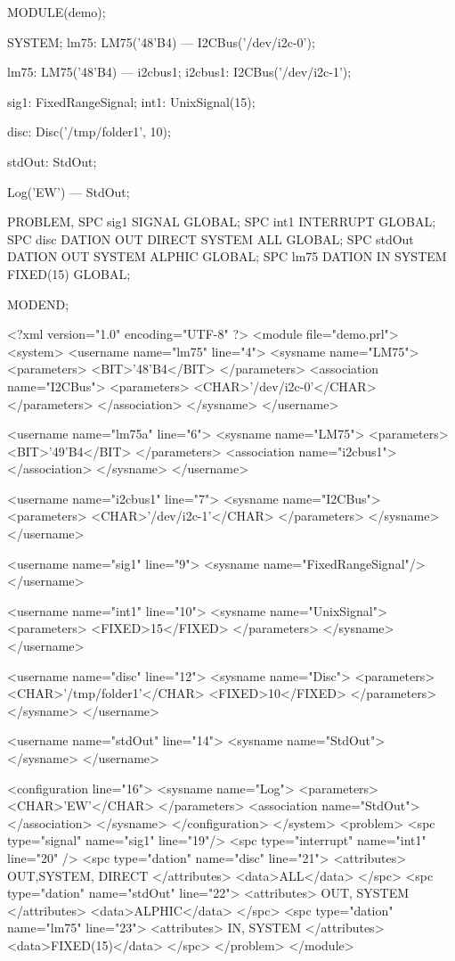 \begin{PEARLCode}
MODULE(demo);

SYSTEM;
lm75: LM75('48'B4) --- I2CBus('/dev/i2c-0');

lm75: LM75('48'B4) --- i2cbus1;
i2cbus1: I2CBus('/dev/i2c-1');

sig1: FixedRangeSignal;
int1: UnixSignal(15);

disc: Disc('/tmp/folder1', 10);

stdOut: StdOut;

Log('EW') --- StdOut;

PROBLEM,
SPC sig1 SIGNAL GLOBAL;
SPC int1 INTERRUPT GLOBAL;
SPC disc DATION OUT DIRECT SYSTEM ALL GLOBAL;
SPC stdOut DATION OUT SYSTEM ALPHIC GLOBAL;
SPC lm75 DATION IN SYSTEM FIXED(15) GLOBAL;

MODEND;
\end{PEARLCode}

\begin{XMLCode}
<?xml version="1.0" encoding="UTF-8" ?>
<module file="demo.prl">
<system>
   <username name="lm75" line="4">
      <sysname name="LM75">
      <parameters>
         <BIT>'48'B4</BIT>
      </parameters>
      <association name="I2CBus">
         <parameters>
            <CHAR>'/dev/i2c-0'</CHAR>
         </parameters>
      </association>
   </sysname>
</username>

<username name="lm75a" line="6">
   <sysname name="LM75">
      <parameters>
         <BIT>'49'B4</BIT>
      </parameters>
      <association name="i2cbus1">
      </association>
   </sysname>
</username>

<username name="i2cbus1" line="7">
   <sysname name="I2CBus">
      <parameters>
         <CHAR>'/dev/i2c-1'</CHAR>
      </parameters>
   </sysname>
</username>

<username name="sig1" line="9">
   <sysname name="FixedRangeSignal"/>
</username>

<username name="int1" line="10">
   <sysname name="UnixSignal">
      <parameters>
         <FIXED>15</FIXED>
      </parameters>
   </sysname>
</username>

<username name="disc" line="12">
   <sysname name="Disc">
      <parameters>
         <CHAR>'/tmp/folder1'</CHAR>
         <FIXED>10</FIXED>
      </parameters>
   </sysname>
</username>

<username name="stdOut" line="14">
   <sysname name="StdOut">
   </sysname>
</username> 

<configuration line="16">
   <sysname name="Log">
      <parameters>
         <CHAR>'EW'</CHAR>
      </parameters>
      <association name="StdOut">
      </association>
   </sysname>
</configuration>
</system>
<problem>
<spc type="signal" name="sig1" line="19"/>
<spc type="interrupt" name="int1" line="20" />
<spc type="dation" name="disc" line="21">
   <attributes> OUT,SYSTEM, DIRECT </attributes>
   <data>ALL</data>
</spc>
<spc type="dation" name="stdOut" line="22">
      <attributes> OUT, SYSTEM </attributes>
      <data>ALPHIC</data>
</spc>
<spc type="dation" name="lm75" line="23">
      <attributes> IN, SYSTEM </attributes>
      <data>FIXED(15)</data>
</spc>
</problem>
</module>
\end{XMLCode}

